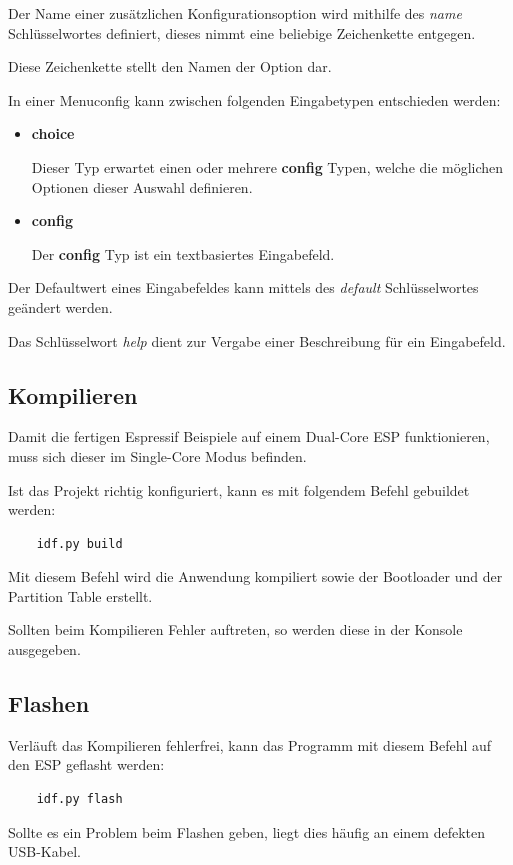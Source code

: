 Der Name einer zusätzlichen Konfigurationsoption wird mithilfe des \textit{name} Schlüsselwortes definiert, dieses nimmt eine beliebige Zeichenkette entgegen.

Diese Zeichenkette stellt den Namen der Option dar.

In einer Menuconfig kann zwischen folgenden Eingabetypen entschieden werden:

\begin{itemize}
    \item \textbf{choice}
    
    Dieser Typ erwartet einen oder mehrere \textbf{config} Typen, welche die möglichen Optionen dieser Auswahl definieren.
    \item \textbf{config}
    
    Der \textbf{config} Typ ist ein textbasiertes Eingabefeld.
\end{itemize}

Der Defaultwert eines Eingabefeldes kann mittels des \textit{default} Schlüsselwortes geändert werden. 

Das Schlüsselwort \textit{help} dient zur Vergabe einer Beschreibung für ein Eingabefeld.

\subsection{Kompilieren}
Damit die fertigen Espressif Beispiele auf einem Dual-Core ESP funktionieren, muss sich dieser im Single-Core Modus befinden.

Ist das Projekt richtig konfiguriert, kann es mit folgendem Befehl gebuildet werden:
\begin{verbatim}
    idf.py build
\end{verbatim}

Mit diesem Befehl wird die Anwendung kompiliert sowie der Bootloader und der Partition Table erstellt.

Sollten beim Kompilieren Fehler auftreten, so werden diese in der Konsole ausgegeben.

\subsection{Flashen}
Verläuft das Kompilieren fehlerfrei, kann das Programm mit diesem Befehl auf den ESP geflasht werden:
\begin{verbatim}
    idf.py flash
\end{verbatim}

Sollte es ein Problem beim Flashen geben, liegt dies häufig an einem defekten USB-Kabel.

